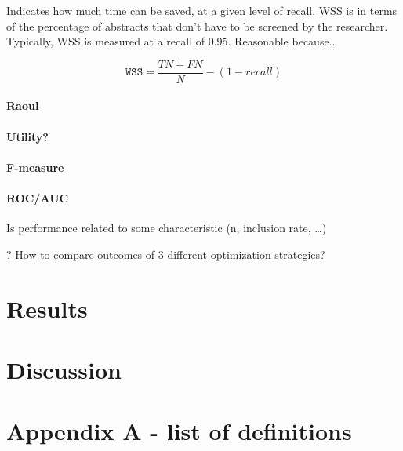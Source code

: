 \documentclass[
]{article}
\begin{document}
Indicates how much time can be saved, at a given level of recall. WSS is
in terms of the percentage of abstracts that don't have to be screened
by the researcher. Typically, WSS is measured at a recall of 0.95.
Reasonable because..

\[\texttt{WSS} = \frac{TN + FN}{N} - (1- recall) \]

\hypertarget{raoul}{%
\paragraph{Raoul}\label{raoul}}

\hypertarget{utility}{%
\paragraph{Utility?}\label{utility}}

\hypertarget{f-measure}{%
\paragraph{F-measure}\label{f-measure}}

\hypertarget{rocauc}{%
\paragraph{ROC/AUC}\label{rocauc}}

Is performance related to some characteristic (n, inclusion rate,
\ldots)

? How to compare outcomes of 3 different optimization strategies?

\newpage

\hypertarget{results-1}{%
\section{Results}\label{results-1}}

\newpage

\hypertarget{discussion-1}{%
\section{Discussion}\label{discussion-1}}

\newpage

\hypertarget{appendix-a---list-of-definitions}{%
\section{Appendix A - list of
definitions}\label{appendix-a---list-of-definitions}}
\end{document}
